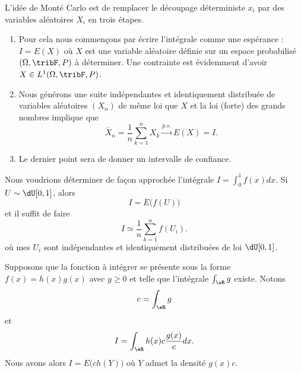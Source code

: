 L'idée de Monté Carlo est de remplacer le découpage déterministe \( x_i\) par des variables aléatoires \( X_i\) en trois étapes.

\begin{enumerate}
	\item
	      Pour cela nous commençons par écrire l'intégrale comme une espérance : \( I=E(X)\) où \( X\) est une variable aléatoire définie sur un espace probabilisé \( (\Omega,\tribF,P)\) à déterminer. Une contrainte est évidemment d'avoir \( X\in L^1(\Omega,\tribF,P)\).

	\item
	      Nous générons une suite indépendantes et identiquement distribuée de variables aléatoires \( (X_n)\) de même loi que \( X\) et la loi (forte) des grands nombres implique que
	      \begin{equation}
		      \bar X_n=\frac{1}{ n }\sum_{k=1}^nX_k\stackrel{p.s.}{\longrightarrow} E(X)=I.
	      \end{equation}

	\item
	      Le dernier point sera de donner un intervalle de confiance.
\end{enumerate}

\begin{example}     \label{ExempleIintfdxEXu}
	Nous voudrions déterminer de façon approchée l'intégrale \( I=\int_0^1 f(x)dx\). Si \( U\sim\dU\mathopen[ 0 , 1 \mathclose]\), alors
	\begin{equation}
		I=E\big( f(U) \big)
	\end{equation}
	et il suffit de faire
	\begin{equation}
		I\simeq\frac{1}{ n }\sum_{k=1}^nf(U_i).
	\end{equation}
	où mes \( U_i\) sont indépendantes et identiquement distribuées de loi \( \dU\mathopen[ 0 , 1 \mathclose]\).
\end{example}

\begin{example}
	Supposons que la fonction à intégrer se présente sous la forme \( f(x)=h(x)g(x)\) avec \( g\geq 0\) et telle que l'intégrale \( \int_{\eR}g\) existe. Notons
	\begin{equation}
		c=\int_{\eR}g
	\end{equation}
	et
	\begin{equation}
		I=\int_{\eR}h(x)c\frac{ g(x) }{ c }dx.
	\end{equation}
	Nous avons alors \( I=E\big( ch(Y) \big)\) où \( Y\) admet la densité \( g(x)c\).
\end{example}

